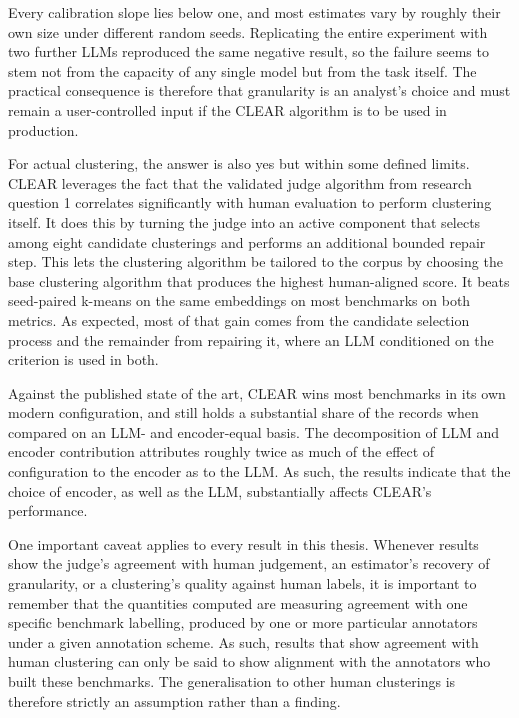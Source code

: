 \documentclass[11pt,a4paper,oneside]{report}
\begin{document}
Every calibration slope lies below one, and most estimates
vary by roughly their own size under different random seeds. Replicating the entire experiment with two further LLMs reproduced the
same negative result, so the failure seems to stem not from the capacity of
any single model but from the task itself. The practical consequence is therefore that granularity is an analyst's choice and must
remain a user-controlled input if the CLEAR algorithm is to be used in production.




For actual clustering, the answer is also yes but within some defined limits. CLEAR leverages the fact that the validated judge algorithm from research question 1 correlates significantly with human evaluation to perform clustering itself. It does this by turning the judge into an active component that selects among eight candidate clusterings and performs an additional bounded repair step. This lets the clustering algorithm be tailored to the corpus by choosing the base clustering algorithm that produces the highest human-aligned score. It beats seed-paired k-means on the same embeddings on most benchmarks on both metrics. As expected, most of that gain comes from the candidate selection process and the remainder from repairing it, where an LLM conditioned on the criterion is used in both. 

Against the published state of the art, CLEAR wins most benchmarks in its own modern configuration, and still holds a substantial share of the records when compared on an LLM- and encoder-equal basis. The decomposition of LLM and encoder contribution attributes roughly twice as much of the effect of configuration to the encoder as to the LLM. As such, the results indicate that the choice of encoder, as well as the LLM, substantially affects CLEAR's performance. 

One important caveat applies to every result in this thesis.
Whenever results show the judge's agreement with human
judgement, an estimator's recovery of granularity, or a
clustering's quality against human labels, it is important to remember that the quantities 
computed are measuring agreement with one specific benchmark labelling, produced
by one or more particular annotators under a given annotation scheme. As such, results that show agreement with human clustering can only be said to show alignment with the annotators who built these benchmarks. The generalisation to other
human clusterings is therefore strictly an assumption rather than a finding.
\end{document}
